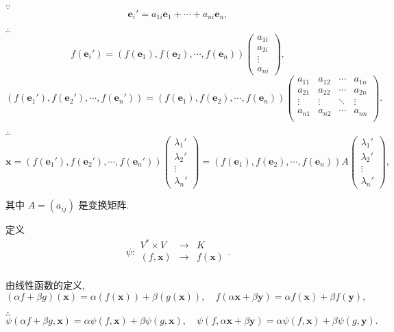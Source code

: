 \documentclass[color=black,device=normal,lang=cn,mode=geye]{elegantnote}
\begin{document}
$\because$
\[\boldsymbol{e}_i'=a_{1i}\boldsymbol{e}_1+\cdots+a_{ni}\boldsymbol{e}_n,\]

$\therefore$
\[f(\boldsymbol{e}_i')=(f(\boldsymbol{e}_1),f(\boldsymbol{e}_2),\cdots,f(\boldsymbol{e}_n))\begin{pmatrix}
    a_{1i} \\
    a_{2i} \\
    \vdots \\
    a_{ni}
\end{pmatrix},\]
\[(f(\boldsymbol{e}_1'),f(\boldsymbol{e}_2'),\cdots,f(\boldsymbol{e}_n'))=(f(\boldsymbol{e}_1),f(\boldsymbol{e}_2),\cdots,f(\boldsymbol{e}_n))\begin{pmatrix}
    a_{11} & a_{12} & \cdots & a_{1n} \\
    a_{21} & a_{22} & \cdots & a_{2n} \\
    \vdots & \vdots & \ddots & \vdots \\
    a_{n1} & a_{n2} & \cdots & a_{nn} \\
\end{pmatrix}.\]

$\therefore$
\[\boldsymbol{x}=(f(\boldsymbol{e}_1'),f(\boldsymbol{e}_2'),\cdots,f(\boldsymbol{e}_n'))\begin{pmatrix}
    \lambda_1' \\
    \lambda_2' \\
    \vdots \\
    \lambda_n'
\end{pmatrix}=(f(\boldsymbol{e}_1),f(\boldsymbol{e}_2),\cdots,f(\boldsymbol{e}_n))A\begin{pmatrix}
    \lambda_1' \\
    \lambda_2' \\
    \vdots \\
    \lambda_n'
\end{pmatrix},\]

其中 $A=(a_{ij})$ 是变换矩阵.

定义
\[\psi:\begin{array}{rcl}
    V^*\times V & \to & K \\
    (f,\boldsymbol{x}) & \to & f(\boldsymbol{x}) \\
\end{array}.\]

由线性函数的定义,
\[(\alpha f+\beta g)(\boldsymbol{x})=\alpha(f(\boldsymbol{x}))+\beta(g(\boldsymbol{x})),\quad f(\alpha\boldsymbol{x}+\beta\boldsymbol{y})=\alpha f(\boldsymbol{x})+\beta f(\boldsymbol{y}),\]

$\therefore$
\[\psi(\alpha f+\beta g,\boldsymbol{x})=\alpha\psi(f,\boldsymbol{x})+\beta\psi(g,\boldsymbol{x}),\quad\psi(f,\alpha\boldsymbol{x}+\beta\boldsymbol{y})=\alpha\psi(f,\boldsymbol{x})+\beta\psi(g,\boldsymbol{y}).\]
\end{document}
